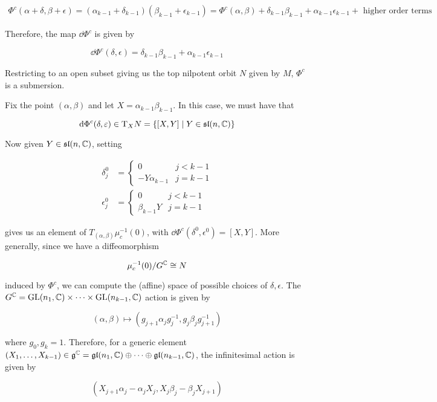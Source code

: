 \documentclass{article}
\renewcommand{\sl}{\mathfrak{sl}}
\begin{document}
\begin{align*}
    \Phi^c(\alpha + \delta, \beta + \epsilon) = (\alpha_{k-1} + \delta_{k-1})(\beta_{k-1} + \epsilon_{k-1}) = \Phi^c(\alpha, \beta) + \delta_{k-1}\beta_{k-1} + \alpha_{k-1}\epsilon_{k-1} + \text{ higher order terms}
\end{align*}

Therefore, the map \(\dd\Phi^c\) is given by

\[\dd\Phi^c(\delta, \epsilon) = \delta_{k-1}\beta_{k-1} + \alpha_{k-1}\epsilon_{k-1}\]

Restricting to an open subset giving us the top nilpotent orbit \(N\) given by \(M\), \(\Phi^c\) is a submersion.

Fix the point \((\alpha, \beta)\) and let \(X = \alpha_{k-1}\beta_{k-1}\). In this case, we must have that

\[\dd\Phi^c(\delta, \epsilon) \in \T_XN = \left\{[X, Y] \mid Y \in \sl(n, \C)\right\}\]

Now given \(Y \in \sl(n, \C)\), setting

\begin{align*}
    \delta_j ^0&= \begin{cases}
        0 & j < k-1 \\
        -Y\alpha_{k-1} & j = k - 1
    \end{cases} \\
    \epsilon_j^0 &= \begin{cases}
        0 & j < k - 1 \\
        \beta_{k-1}Y & j = k - 1
    \end{cases}
\end{align*}

gives us an element of \(T_{(\alpha, \beta)}\mu_c^{-1}(0)\), with \(\dd\Phi^c(\delta^0, \epsilon^0) = [X, Y]\). More generally, since we have a diffeomorphism

\[\mu_c^{-1}(0)/G^{\mathbb{C}} \cong N\]

induced by \(\Phi^c\), we can compute the (affine) space of possible choices of \(\delta, \epsilon\). The \(G^{\mathbb{C}} = \operatorname{GL}(n_1,\mathbb{C}) \times \cdots \times \operatorname{GL}(n_{k-1}, \mathbb{C})\) action is given by

\[(\alpha, \beta) \mapsto (g_{j+1}\alpha_jg_j^{-1}, g_j\beta_jg_{j+1}^{-1})\]

where \(g_0, g_k = 1\). Therefore, for a generic element \((X_1, \dots, X_{k-1}) \in \mathfrak{g}^{\mathbb{C}} = \mathfrak{g}\mathfrak{l}(n_1, \mathbb{C}) \oplus \cdots \oplus \mathfrak{g}\mathfrak{l}(n_{k-1}, \mathbb{C})\), the infinitesimal action is given by

\[(X_{j+1}\alpha_j - \alpha_jX_j, X_j\beta_j - \beta_jX_{j+1})\]
\end{document}
